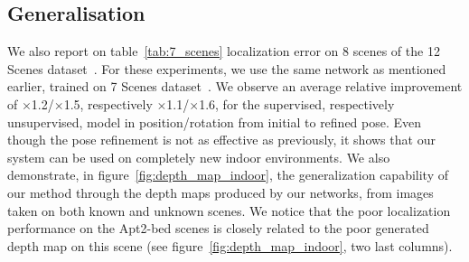 \subsection{Generalisation} 

We also report on table~\ref{tab:7_scenes} localization error on 8 scenes of the 12 Scenes dataset~\citep{Valentin2016}. For these experiments, we use the same network as mentioned earlier, trained on 7 Scenes dataset~\citep{Shotton2013}. We observe an average relative improvement of $\times$1.2/$\times$1.5, respectively $\times$1.1/$\times$1.6, for the supervised, respectively unsupervised, model in position/rotation from initial to refined pose. Even though the pose refinement is not as effective as previously, it shows that our system can be used on completely new indoor environments. We also demonstrate, in figure~\ref{fig:depth_map_indoor}, the generalization capability of our method through the depth maps produced by our networks, from images taken on both known and unknown scenes. We notice that the poor localization performance on the Apt2-bed scenes is closely related to the poor generated depth map on this scene (see figure~\ref{fig:depth_map_indoor}, two last columns).
